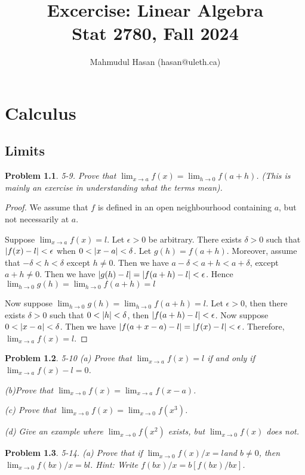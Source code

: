 \documentclass[12pt]{book}
\title{Excercise: Linear Algebra\\
\large{Stat 2780, Fall 2024}}
\author{Mahmudul Hasan (hasan@uleth.ca)\\
}
\newcommand\T{\rule{0pt}{2.6ex}}
\newcommand\B{\rule[-1.2ex]{0pt}{0pt}}
\newtheorem*{problem*}{Problem}
\begin{document}
% 

\chapter{Calculus}
\section{Limits}
\begin{problem*}
  5-9. Prove that $\lim_{x\to a} f(x) = \lim_{h \to 0}f(a+h)$. (This is mainly an exercise in understanding what the terms mean). 
\end{problem*}

\begin{proof}
  \T\B We assume that $f$ is defined in an open neighbourhood containing $a$, but not necessarily at $a$.

  \T\B Suppose $\lim_{x\to a} f(x) = l$. Let $\epsilon > 0$ be arbitrary. There exists $\delta > 0$ such that $\abs{f(x) -l } < \epsilon$ when $0 < \abs{x-a} < \delta$. Let $g(h) = f(a+h)$. Moreover, assume that $-\delta < h < \delta$ except $h \ne 0$. Then we have $a - \delta < a+h < a+\delta$, except $a+h \ne 0$. Then we have $\abs{g(h) -l  } = \abs{f(a+h) -l } <  \epsilon$. Hence $\lim_{h\to 0} g(h) = \lim_{h\to 0} f(a+h) = l$

  \T\B Now suppose $\lim_{h\to 0} g(h) = \lim_{h\to 0} f(a+h) = l$. Let $\epsilon > 0$, then there exists $\delta > 0$ such that $0 < \abs{h} < \delta $, then $\abs{f(a+h) - l } <\epsilon$. Now suppose $0< \abs{x -a} < \delta$. Then we have $\abs{f(a+x -a) -l } = \abs{f(x) -l }< \epsilon$. Therefore, $\lim_{x \to a}f(x) = l$. 
\end{proof}

\begin{problem*}
  \T\B 5-10 (a) Prove that $\lim_{x\to a}f(x) = l$ if and only if $\lim_{x \to a} f(x) -l = 0$.

  \T\B(b)Prove that $\lim_{x \to 0} f(x) = \lim_{x \to a}f(x-a)$.

  \T\B (c) Prove that $\lim_{x \to 0}f(x) = \lim_{x \to 0} f(x^3)$.

  \T\B (d) Give an example where $\lim_{x \to 0} f(x^2) $ exists, but $\lim_{x \to 0}f(x)$ does not. 
\end{problem*}

\begin{problem*}
  \T\B 5-14. (a) Prove that if $\lim_{x \to 0} f(x) / x = l $and $b \ne 0$, then $\lim_{x \to 0} f(bx)/x =bl$. Hint: Write $f(bx)/x = b[f(bx)/bx]$. 
\end{problem*}
\end{document}
